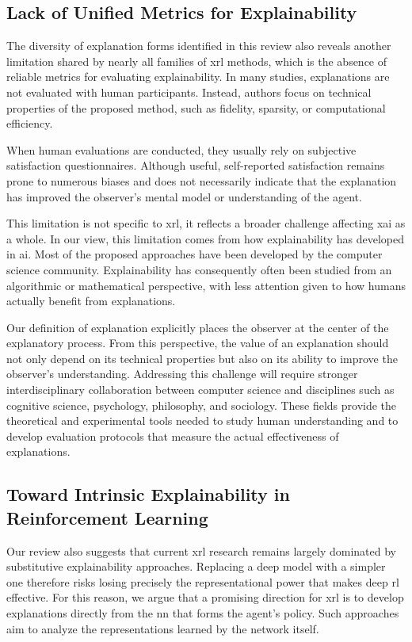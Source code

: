 \subsection{Lack of Unified Metrics for Explainability}

The diversity of explanation forms identified in this review also reveals another limitation shared by nearly all families of \gls{xrl} methods, which is the absence of reliable metrics for evaluating explainability.
In many studies, explanations are not evaluated with human participants.
Instead, authors focus on technical properties of the proposed method, such as fidelity, sparsity, or computational efficiency.

When human evaluations are conducted, they usually rely on subjective satisfaction questionnaires.
Although useful, self-reported satisfaction remains prone to numerous biases and does not necessarily indicate that the explanation has improved the observer's mental model or understanding of the agent.

This limitation is not specific to \gls{xrl}, it reflects a broader challenge affecting \gls{xai} as a whole.
In our view, this limitation comes from how explainability has developed in \gls{ai}.
Most of the proposed approaches have been developed by the computer science community.
Explainability has consequently often been studied from an algorithmic or mathematical perspective, with less attention given to how humans actually benefit from explanations.

Our definition of explanation explicitly places the observer at the center of the explanatory process.
From this perspective, the value of an explanation should not only depend on its technical properties but also on its ability to improve the observer's understanding.
Addressing this challenge will require stronger interdisciplinary collaboration between computer science and disciplines such as cognitive science, psychology, philosophy, and sociology.
These fields provide the theoretical and experimental tools needed to study human understanding and to develop evaluation protocols that measure the actual effectiveness of explanations.

\subsection{Toward Intrinsic Explainability in Reinforcement Learning}

Our review also suggests that current \gls{xrl} research remains largely dominated by substitutive explainability approaches.
Replacing a deep model with a simpler one therefore risks losing precisely the representational power that makes deep \gls{rl} effective.
For this reason, we argue that a promising direction for \gls{xrl} is to develop explanations directly from the \gls{nn} that forms the agent's policy.
Such approaches aim to analyze the representations learned by the network itself.

